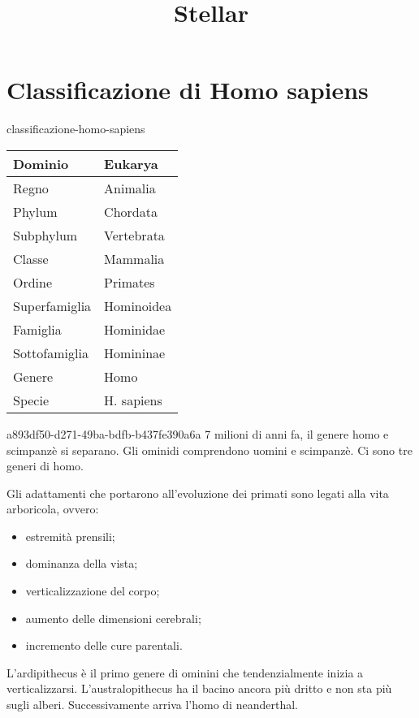 \documentclass[preview]{standalone}
\begin{document}
\title{Stellar}
\genpage

\section{Classificazione di Homo sapiens}

\begin{snippet}{classificazione-homo-sapiens}
    \vspace{0.25cm}
    \begin{center}
        \begin{tabular}{|l|l|}
            \hline Dominio & Eukarya \\
            \hline Regno & Animalia \\
            \hline Phylum & Chordata \\
            \hline Subphylum & Vertebrata \\
            \hline Classe & Mammalia \\
            \hline Ordine & Primates \\
            \hline Superfamiglia & Hominoidea \\
            \hline Famiglia & Hominidae \\
            \hline Sottofamiglia & Homininae \\
            \hline Genere & Homo \\
            \hline Specie & H. sapiens \\
            \hline
        \end{tabular}
    \end{center}
    \vspace{0.25cm}
\end{snippet}

\begin{snippet}{a893df50-d271-49ba-bdfb-b437fe390a6a}
    7 milioni di anni fa, il genere homo e scimpanzè si separano.
    Gli ominidi comprendono uomini e scimpanzè.
    Ci sono tre generi di homo.

    Gli adattamenti che portarono all'evoluzione dei primati sono legati alla
    vita arboricola, ovvero:
    \begin{itemize}
        \item estremità prensili;
        \item dominanza della vista;
        \item verticalizzazione del corpo;
        \item aumento delle dimensioni cerebrali;
        \item incremento delle cure parentali.
    \end{itemize}

    L'ardipithecus è il primo genere di ominini che tendenzialmente inizia a verticalizzarsi.
    L'australopithecus ha il bacino ancora più dritto e non sta più sugli alberi.
    Successivamente arriva l'homo di neanderthal.
\end{snippet}

\end{document}
